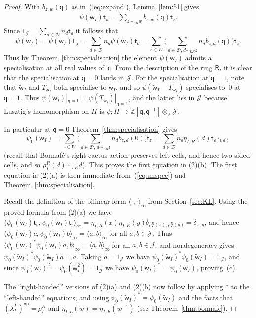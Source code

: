 \documentclass[11pt]{article}
\theoremstyle{plain}
\theoremstyle{definition}
\numberwithin{equation}{section}
\def\tw{\widetilde{\mathsf{w}}_I}
\def\cD{\mathcal{D}}
\def\cJ{\mathcal{J}}
\newcommand{\la}{\lambda}
\def\ZZ{\mathbb{Z}}
\def\la{\lambda}
\def\la{\lambda}
\def\sR{\mathsf{R}}
\newcommand{\sw}{\mathsf{w}}
\newcommand{\st}{\mathsf{t}}
\newcommand{\sq}{\mathsf{q}}
\begin{document}
\begin{proof}
With $b_{z,w}(\sq)$ as in~(\ref{eq:expand}), Lemma~\ref{lem:51} gives
\begin{align}\label{eq:unspec}
\psi(\tw)\st_w=\sum_{z\sim_{LR}w}b_{z,w}(\sq)\st_z. 
\end{align}
Since $1_{\cJ}=\sum_{d\in\cD}n_d\st_d$ it follows that 
$$
\psi(\tw)=\psi(\tw)1_{\cJ}=\sum_{d\in\cD}n_d\psi(\tw)\st_d=\sum_{z\in W}\bigg(\sum_{d\in\cD,\,d\sim_{LR}z}n_db_{z,d}(\sq)\bigg)\st_z.
$$
Thus by Theorem~\ref{thm:specialisation} the element $\psi(\tw)$ admits a specialisation at all real values of~$\sq$. From the description of the ring $\sR_I$ it is clear that the specialisation at $\sq=0$ lands in $\cJ$. For the specialisation at $\sq=1$, note that $\tw$ and $T_{\sw_I}$ both specialise to $\sw_I$, and so $\psi(\tw-T_{\sw_I})$ specialises to~$0$ at $\sq=1$. Thus $\psi(\tw)|_{\sq=1}=\psi(T_{\sw_I})|_{\sq=1}$, and the latter lies in $\cJ$ because Lusztig's homomorphism on $H$ is $\psi:H\to\ZZ[\sq,\sq^{-1}]\otimes_{\ZZ}\cJ$. 

In particular at $\sq=0$ Theorem~\ref{thm:specialisation} gives
$$
\psi_0(\tw)=\sum_{z\in W}\bigg(\sum_{d\in\cD,\,d\sim_{LR}z}n_db_{z,d}(0)\bigg)\st_z=\sum_{d\in \cD}n_d \eta_{I,R}(d)\st_{\rho_I^R(d)}
$$
(recall that Bonnaf\'e's right cactus action preserves left cells, and hence two-sided cells, and so 
$
\rho_I^R(d)\sim_{LR}d 
$). This proves the first equation in (2)(b). The first equation in (2)(a) is then immediate from~(\ref{eq:unspec}) and Theorem~\ref{thm:specialisation}. 

Recall the definition of the bilinear form $\langle\cdot,\cdot\rangle_{\infty}$ from Section~\ref{sec:KL}. Using the proved formula from (2)(a) we have $\langle\psi_0(\tw)\st_x,\psi_0(\tw)\st_y\rangle_{\infty}=\eta_{I,R}(x)\eta_{I,R}(y)\delta_{\rho_I^R(x),\rho_I^R(y)}=\delta_{x,y}$, and hence $\langle \psi_0(\tw)a,\psi_0(\tw)b\rangle_{\infty}=\langle a,b\rangle_{\infty}$ for all $a,b\in\cJ$. Thus $\langle \psi_0(\tw)^*\psi_0(\tw)a,b\rangle_{\infty}=\langle a,b\rangle_{\infty}$ for all $a,b\in\cJ$, and nondegeneracy gives $\psi_0(\tw)^*\psi_0(\tw)a=a$. Taking $a=1_{\cJ}$ we have $\psi_0(\tw)^*\psi_0(\tw)=1_{\cJ}$, and since $\psi_0(\tw)^2=\psi_0(\tw^2)=1_{\cJ}$ we have $\psi_0(\tw)^*=\psi_0(\tw)$, proving~(c). 

The ``right-handed'' versions of (2)(a) and (2)(b) now follow by applying $*$ to the ``left-handed'' equations, and using $\psi_0(\tw)^*=\psi_0(\tw)$ and the facts that $(\la_I^L)^{\mathsf{op}}=\rho_I^R$ and $\eta_{I,L}(w)=\eta_{I,R}(w^{-1})$ (see Theorem~\ref{thm:bonnafe}). 
\end{proof}
\end{document}
